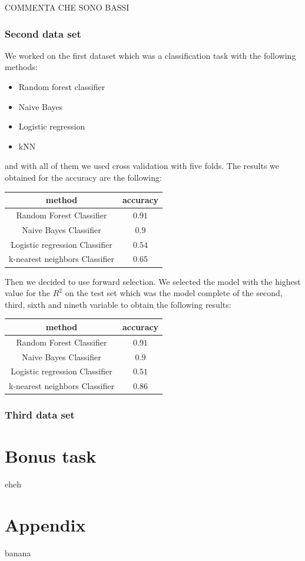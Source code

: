 \documentclass[a4paper,oneside,12pt]{article}
\begin{document}
COMMENTA CHE SONO BASSI
\subsubsection{Second data set}

We worked on the first dataset which was a classification task with the following methods:

\begin{itemize}
\item Random forest classifier
\item Naive Bayes
\item Logistic regression
\item kNN
\end{itemize}

and with all of them we used cross validation with five folds. The results we obtained for the accuracy are the following:

\begin{table}[H]
\centering
\begin{tabular}{|c|c|}
\hline
method & accuracy \\
\hline
Random Forest Classifier  & $0.91$ \\
\hline
Naive Bayes Classifier  & $0.9$ \\
\hline
Logistic regression Classifier  & $0.54$ \\
\hline
k-nearest neighbors Classifier  & $0.65$ \\
\hline

\end{tabular}
\end{table}

Then we decided to use forward selection. We selected the model with the highest value for the $R^2$ on the test set which was the model complete of the second, third, sixth and nineth variable to obtain the following results:

\begin{table}[H]
\centering
\begin{tabular}{|c|c|}
\hline
method & accuracy \\
\hline
Random Forest Classifier  & $0.91$ \\
\hline
Naive Bayes Classifier  & $0.9$ \\
\hline
Logistic regression Classifier  & $0.51$ \\
\hline
k-nearest neighbors Classifier  & $0.86$ \\
\hline

\end{tabular}
\end{table}

\subsubsection{Third data set}
\newpage
\section{Bonus task}

eheh

\newpage
\appendix

\section{Appendix}
banana
\end{document}
